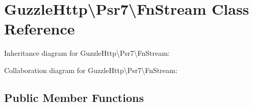 \hypertarget{classGuzzleHttp_1_1Psr7_1_1FnStream}{}\section{Guzzle\+Http\textbackslash{}Psr7\textbackslash{}Fn\+Stream Class Reference}
\label{classGuzzleHttp_1_1Psr7_1_1FnStream}


Inheritance diagram for Guzzle\+Http\textbackslash{}Psr7\textbackslash{}Fn\+Stream\+:


Collaboration diagram for Guzzle\+Http\textbackslash{}Psr7\textbackslash{}Fn\+Stream\+:
\subsection*{Public Member Functions}

